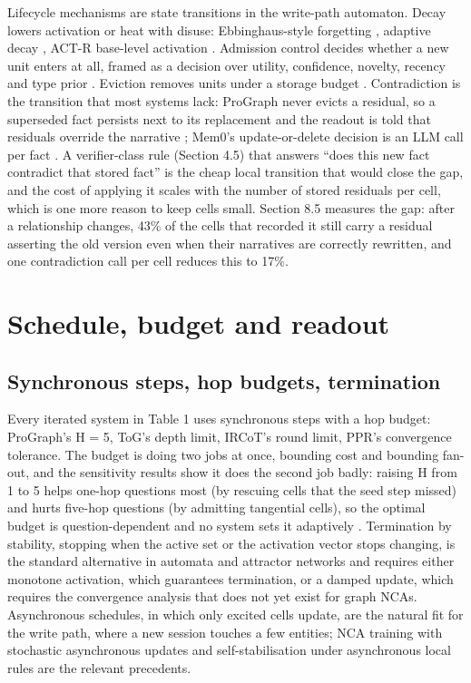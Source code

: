\documentclass[11pt]{article}
\begin{document}
Lifecycle mechanisms are state transitions in the write-path automaton. Decay lowers activation or heat with disuse: Ebbinghaus-style forgetting \cite{memorybank}, adaptive decay \cite{fademem}, ACT-R base-level activation \cite{honda2025}. Admission control decides whether a new unit enters at all, framed as a decision over utility, confidence, novelty, recency and type prior \cite{amac}. Eviction removes units under a storage budget \cite{evermemos}. Contradiction is the transition that most systems lack: ProGraph never evicts a residual, so a superseded fact persists next to its replacement and the readout is told that residuals override the narrative \cite{prograph}; Mem0's update-or-delete decision is an LLM call per fact \cite{mem0}. A verifier-class rule (Section 4.5) that answers ``does this new fact contradict that stored fact'' is the cheap local transition that would close the gap, and the cost of applying it scales with the number of stored residuals per cell, which is one more reason to keep cells small. Section 8.5 measures the gap: after a relationship changes, 43\% of the cells that recorded it still carry a residual asserting the old version even when their narratives are correctly rewritten, and one contradiction call per cell reduces this to 17\%.

\section{Schedule, budget and readout}

\subsection{Synchronous steps, hop budgets, termination}

Every iterated system in Table 1 uses synchronous steps with a hop budget: ProGraph's H = 5, ToG's depth limit, IRCoT's round limit, PPR's convergence tolerance. The budget is doing two jobs at once, bounding cost and bounding fan-out, and the sensitivity results show it does the second job badly: raising H from 1 to 5 helps one-hop questions most (by rescuing cells that the seed step missed) and hurts five-hop questions (by admitting tangential cells), so the optimal budget is question-dependent and no system sets it adaptively \cite{prograph}. Termination by stability, stopping when the active set or the activation vector stops changing, is the standard alternative in automata and attractor networks \cite{hopfield2020} and requires either monotone activation, which guarantees termination, or a damped update, which requires the convergence analysis that does not yet exist for graph NCAs. Asynchronous schedules, in which only excited cells update, are the natural fit for the write path, where a new session touches a few entities; NCA training with stochastic asynchronous updates \cite{nca} and self-stabilisation under asynchronous local rules \cite{dijkstra1974} are the relevant precedents.
\end{document}
